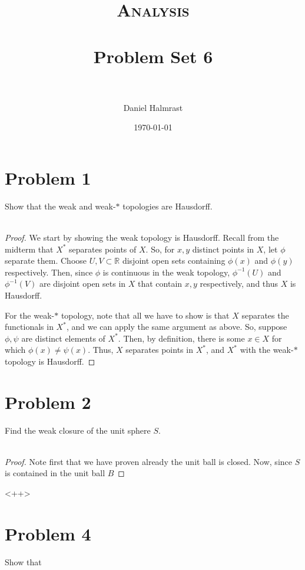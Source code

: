 \documentclass[fontsize=11pt]{scrartcl} %
\title{	
\normalfont \normalsize 
\textsc{Analysis} \\ [25pt] %
\horrule{0.5pt} \\[0.4cm] %
\huge Problem Set 6 \\ %
\horrule{2pt} \\[0.5cm] %
}
\author{Daniel Halmrast} %
\date{\normalsize\today} %
\numberwithin{equation}{section} %
\numberwithin{figure}{section} %
\numberwithin{table}{section} %
\newcommand{\R}{\mathbb{R}}
\begin{document}
\maketitle %

\section*{Problem 1}
Show that the weak and weak-$*$ topologies are Hausdorff.
\\
\\
\begin{proof}
    We start by showing the weak topology is Hausdorff. Recall from the midterm
    that $X^*$ separates points of $X$. So, for $x,y$ distinct points in $X$,
    let $\phi$ separate them. Choose $U,V\subset \R$ disjoint open sets
    containing $\phi(x)$ and $\phi(y)$ respectively. Then, since $\phi$ is
    continuous in the weak topology, $\phi^{-1}(U)$ and $\phi^{-1}(V)$ are
    disjoint open sets in $X$ that contain $x,y$ respectively, and thus $X$ is
    Hausdorff.

    For the weak-$*$ topology, note that all we have to show is that $X$
    separates the functionals in $X^*$, and we can apply the same argument as
    above. So, suppose $\phi,\psi$ are distinct elements of $X^*$. Then, by
    definition, there is some $x\in X$ for which $\phi(x)\neq \psi(x)$. Thus,
    $X$ separates points in $X^*$, and $X^*$ with the weak-$*$ topology is
    Hausdorff.
\end{proof}

\newpage

\section*{Problem 2}
Find the weak closure of the unit sphere $S$.
\\
\\
\begin{proof}
    Note first that we have proven already the unit ball is closed. Now, since
    $S$ is contained in the unit ball $B$
\end{proof}<++>

\section*{Problem 4}
Show that 
\end{document}
